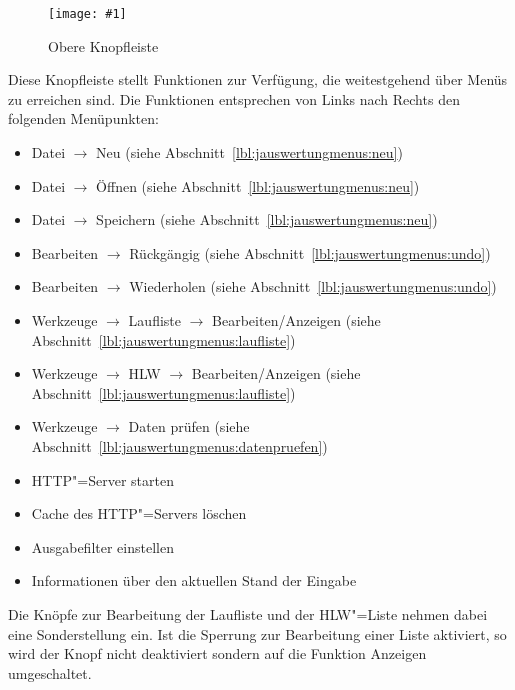 \documentclass[11pt,a4paper,twoside,ngerman]{article}
\newcommand{\hsmimage}[3]{\begin{figure}[!ht]\centering\texttt{[image: \#1]}\caption{#3}\end{figure}}
\begin{document}
\hsmimage{pics/knopfleiste}{.80\textwidth}{Obere Knopfleiste}
Diese Knopfleiste stellt Funktionen zur Verfügung, die weitestgehend über Menüs zu erreichen sind. Die Funktionen entsprechen von Links nach Rechts den folgenden Menüpunkten:
\begin{itemize}

\item Datei \ensuremath{\rightarrow} Neu (siehe Abschnitt~\ref{lbl:jauswertungmenus:neu})


\item Datei \ensuremath{\rightarrow} Öffnen (siehe Abschnitt~\ref{lbl:jauswertungmenus:neu})


\item Datei \ensuremath{\rightarrow} Speichern (siehe Abschnitt~\ref{lbl:jauswertungmenus:neu})


\item Bearbeiten \ensuremath{\rightarrow} Rückgängig (siehe Abschnitt~\ref{lbl:jauswertungmenus:undo})


\item Bearbeiten \ensuremath{\rightarrow} Wiederholen (siehe Abschnitt~\ref{lbl:jauswertungmenus:undo})


\item Werkzeuge \ensuremath{\rightarrow} Laufliste \ensuremath{\rightarrow} Bearbeiten/Anzeigen (siehe Abschnitt~\ref{lbl:jauswertungmenus:laufliste})


\item Werkzeuge \ensuremath{\rightarrow} HLW \ensuremath{\rightarrow} Bearbeiten/Anzeigen (siehe Abschnitt~\ref{lbl:jauswertungmenus:laufliste})


\item Werkzeuge \ensuremath{\rightarrow} Daten prüfen (siehe Abschnitt~\ref{lbl:jauswertungmenus:datenpruefen})


\item HTTP"=Server starten


\item Cache des HTTP"=Servers löschen


\item Ausgabefilter einstellen


\item Informationen über den aktuellen Stand der Eingabe


\end{itemize}


Die Knöpfe zur Bearbeitung der Laufliste und der HLW"=Liste nehmen dabei eine Sonderstellung ein. Ist die Sperrung zur Bearbeitung einer Liste aktiviert, so wird der Knopf nicht deaktiviert sondern auf die Funktion \glqq{}Anzeigen\grqq{} umgeschaltet.
\end{document}
